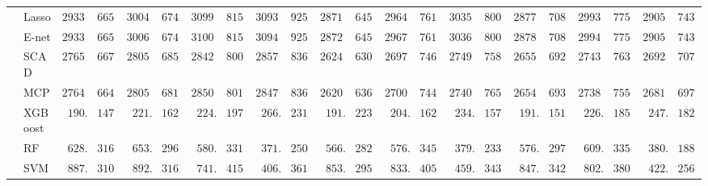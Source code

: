 \begin{tabular}{ll|ll|llllll|llllll|llllll}
 & Lasso  & $2933.37$ & $665.42$ & $3004.25$ & $674.97$ & $3099.63$ & $815.83$ & $3093.25$ & $925.30$ & $2871.14$ & $645.92$ & $2964.88$ & $761.53$ & $3035.75$ & $800.25$ & $2877.75$ & $708.28$ & $2993.85$ & $775.68$ & $2905.24$ & $743.55$ \\
 & E-net  & $2933.80$ & $665.13$ & $3006.87$ & $674.09$ & $3100.70$ & $815.76$ & $3094.34$ & $925.02$ & $2872.16$ & $645.24$ & $2967.23$ & $761.42$ & $3036.18$ & $800.92$ & $2878.16$ & $708.20$ & $2994.19$ & $775.20$ & $2905.94$ & $743.35$ \\
 & SCAD  & $2765.01$ & $667.33$ & $2805.25$ & $685.93$ & $2842.93$ & $800.46$ & $2857.67$ & $836.40$ & $2624.79$ & $630.71$ & $2697.69$ & $746.83$ & $2749.46$ & $758.05$ & $2655.23$ & $692.99$ & $2743.85$ & $763.93$ & $2692.26$ & $707.46$ \\
 & MCP  & $2764.08$ & $664.05$ & $2805.50$ & $681.74$ & $2850.51$ & $801.61$ & $2847.17$ & $836.86$ & $2620.82$ & $636.40$ & $2700.59$ & $744.39$ & $2740.88$ & $765.51$ & $2654.15$ & $693.92$ & $2738.18$ & $755.57$ & $2681.04$ & $697.26$ \\
 & XGBoost  & $\phantom{0}190.56$ & $147.80$ & $\phantom{0}221.67$ & $162.82$ & $\phantom{0}224.52$ & $197.53$ & $\phantom{0}266.47$ & $231.29$ & $\phantom{0}191.43$ & $223.78$ & $\phantom{0}204.59$ & $162.52$ & $\phantom{0}234.98$ & $157.48$ & $\phantom{0}191.65$ & $151.55$ & $\phantom{0}226.31$ & $185.22$ & $\phantom{0}247.03$ & $182.52$ \\
 & RF  & $\phantom{0}628.39$ & $316.62$ & $\phantom{0}653.49$ & $296.42$ & $\phantom{0}580.00$ & $331.42$ & $\phantom{0}371.76$ & $250.63$ & $\phantom{0}566.90$ & $282.04$ & $\phantom{0}576.37$ & $345.03$ & $\phantom{0}379.97$ & $233.35$ & $\phantom{0}576.74$ & $297.22$ & $\phantom{0}609.49$ & $335.54$ & $\phantom{0}380.92$ & $188.49$ \\
 & SVM  & $\phantom{0}887.99$ & $310.08$ & $\phantom{0}892.64$ & $316.19$ & $\phantom{0}741.60$ & $415.68$ & $\phantom{0}406.45$ & $361.71$ & $\phantom{0}853.20$ & $295.44$ & $\phantom{0}833.02$ & $405.90$ & $\phantom{0}459.40$ & $343.12$ & $\phantom{0}847.63$ & $342.78$ & $\phantom{0}802.34$ & $380.53$ & $\phantom{0}422.84$ & $256.70$ \\
\hline 
\end{tabular}

